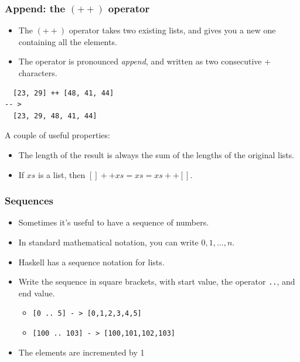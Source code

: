 \documentclass{beamer}
\begin{document}
\begin{frame}[fragile]
\frametitle{Append: the $(++)$ operator}

\begin{itemize}
\item The $(++)$ operator  takes two existing lists, and gives
  you a new one containing all the elements.
\item The operator is pronounced \emph{append}, and written as two
  consecutive + characters.
\end{itemize}

\begin{verbatim}
  [23, 29] ++ [48, 41, 44]
-- >
  [23, 29, 48, 41, 44]
\end{verbatim}

A couple of useful properties:

\begin{itemize}
\item The length of the result is always the sum of the lengths of
  the original lists.
\item If $xs$ is a list, then $[] ++ xs = xs = xs ++ []$.
\end{itemize}

\end{frame}

\begin{frame}[fragile]
\frametitle{Sequences}

\begin{itemize}
\item Sometimes it's useful to have a sequence of numbers.
\item In standard mathematical notation, you can write $0, 1,
  \ldots, n$.
\item Haskell has a sequence notation for lists.
\item Write the sequence in square brackets, with start value, the
 operator \texttt{..}, and end value.
  \begin{itemize}
  \item \texttt{[0 .. 5] \-- > [0,1,2,3,4,5]}
  \item \texttt{[100 .. 103] \-- > [100,101,102,103]}
  \end{itemize}
\item The elements are incremented by 1 
\end{itemize}

\end{frame}
\end{document}
